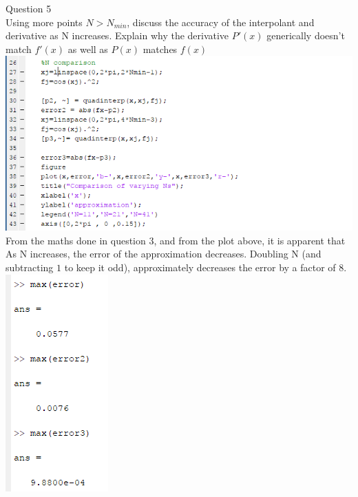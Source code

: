 \documentclass[a4paper]{article}
\begin{document}
	\newpage
	Question 5\\
	Using more points $N > N_{min}$, discuss the accuracy of the interpolant and derivative as N increases. 
	Explain why the derivative $P'(x)$ generically doesn't match $f'(x)$ as well as $P(x)$ matches $f(x)$\\
	\includegraphics{Ncompare.png}
	From the maths done in question 3, and from the plot above, it is apparent that As N increases, the error of the approximation decreases.
	Doubling N (and subtracting $1$ to keep it odd), approximately decreases the error by a factor of 8. 
	\includegraphics{errorcompare.png}
	\\
	
\end{document}
